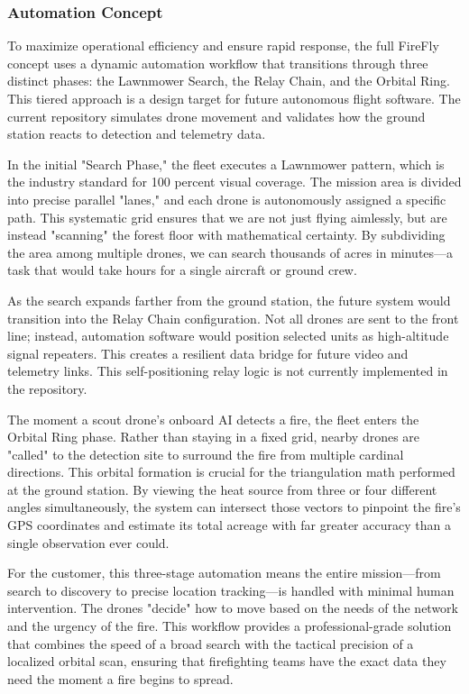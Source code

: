 \documentclass[journal, onecolumn]{IEEEtran}
\begin{document}
\subsubsection{Automation Concept}
To maximize operational efficiency and ensure rapid response, the full FireFly concept uses a dynamic automation workflow that transitions through three distinct phases: the Lawnmower Search, the Relay Chain, and the Orbital Ring. This tiered approach is a design target for future autonomous flight software. The current repository simulates drone movement and validates how the ground station reacts to detection and telemetry data.

In the initial "Search Phase," the fleet executes a Lawnmower pattern, which is the industry standard for 100 percent visual coverage. The mission area is divided into precise parallel "lanes," and each drone is autonomously assigned a specific path. This systematic grid ensures that we are not just flying aimlessly, but are instead "scanning" the forest floor with mathematical certainty. By subdividing the area among multiple drones, we can search thousands of acres in minutes—a task that would take hours for a single aircraft or ground crew.

As the search expands farther from the ground station, the future system would transition into the Relay Chain configuration. Not all drones are sent to the front line; instead, automation software would position selected units as high-altitude signal repeaters. This creates a resilient data bridge for future video and telemetry links. This self-positioning relay logic is not currently implemented in the repository.

The moment a scout drone’s onboard AI detects a fire, the fleet enters the Orbital Ring phase. Rather than staying in a fixed grid, nearby drones are "called" to the detection site to surround the fire from multiple cardinal directions. This orbital formation is crucial for the triangulation math performed at the ground station. By viewing the heat source from three or four different angles simultaneously, the system can intersect those vectors to pinpoint the fire’s GPS coordinates and estimate its total acreage with far greater accuracy than a single observation ever could.

For the customer, this three-stage automation means the entire mission—from search to discovery to precise location tracking—is handled with minimal human intervention. The drones "decide" how to move based on the needs of the network and the urgency of the fire. This workflow provides a professional-grade solution that combines the speed of a broad search with the tactical precision of a localized orbital scan, ensuring that firefighting teams have the exact data they need the moment a fire begins to spread.
\end{document}
